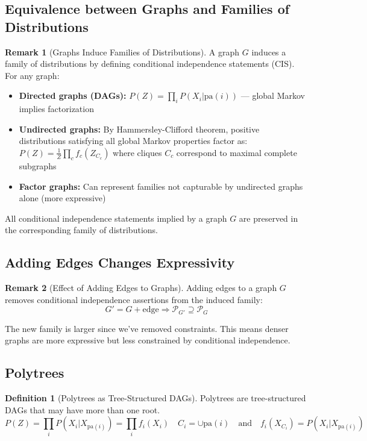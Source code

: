 \documentclass[12pt,a4paper]{article}
\theoremstyle{definition}
\newtheorem{definition}{Definition}[section]
\newtheorem{remark}{Remark}[section]
\begin{document}
\subsection{Equivalence between Graphs and Families of Distributions}

\begin{remark}[Graphs Induce Families of Distributions]
A graph $G$ induces a family of distributions by defining conditional independence statements (CIS). For any graph:
\begin{itemize}
    \item \textbf{Directed graphs (DAGs):} $P(Z) = \prod_i P(X_i | \text{pa}(i))$ — global Markov implies factorization
    \item \textbf{Undirected graphs:} By Hammersley-Clifford theorem, positive distributions satisfying all global Markov properties factor as: $P(Z) = \frac{1}{Z} \prod_c f_c(Z_{C_c})$ where cliques $C_c$ correspond to maximal complete subgraphs
    \item \textbf{Factor graphs:} Can represent families not capturable by undirected graphs alone (more expressive)
\end{itemize}

All conditional independence statements implied by a graph $G$ are preserved in the corresponding family of distributions.
\end{remark}

\subsection{Adding Edges Changes Expressivity}

\begin{remark}[Effect of Adding Edges to Graphs]
Adding edges to a graph $G$ removes conditional independence assertions from the induced family:
\[
G' = G + \text{edge} \Rightarrow \mathcal{P}_{G'} \supseteq \mathcal{P}_{G}
\]

The new family is larger since we've removed constraints. This means denser graphs are more expressive but less constrained by conditional independence.
\end{remark}

\subsection{Polytrees}

\begin{definition}[Polytrees as Tree-Structured DAGs]
Polytrees are tree-structured DAGs that may have more than one root.
\[
P(Z) = \prod_i P(X_i | X_{\text{pa}(i)}) = \prod_i f_i(X_i)  \quad C_i = \cup \text{pa}(i) \quad \text{and} \quad f_i(X_{C_i}) = P(X_i | X_{\text{pa}(i)})
\]
\end{definition}
\end{document}
